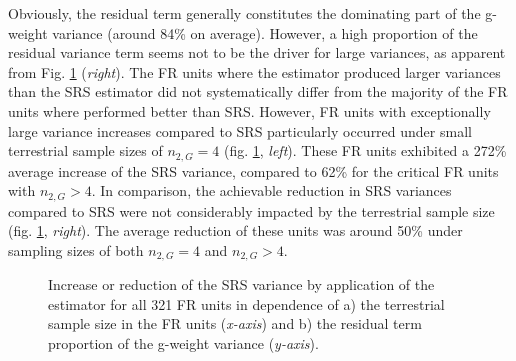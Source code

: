 Obviously, the residual term generally constitutes the dominating part of the \psmall{} g-weight variance (around 84\% on average). However, a high proportion of the residual variance term seems not to be the driver for large \psmall{} variances, as apparent from Fig. \ref{fig:fail} (\textit{right}). The FR units where the \psmall{} estimator produced larger variances than the SRS estimator did not systematically differ from the majority of the FR units where \psmall{} performed better than SRS. However, FR units with exceptionally large variance increases compared to SRS particularly occurred under small terrestrial sample sizes of $n_{2,G} = 4$ (fig. \ref{fig:fail}, \textit{left}). These FR units exhibited a 272\% average increase of the SRS variance, compared to 62\% for the critical FR units with $n_{2,G} > 4$. In comparison, the achievable reduction in SRS variances compared to SRS were not considerably impacted by the terrestrial sample size (fig. \ref{fig:fail}, \textit{right}). The average reduction of these units was around 50\% under sampling sizes of both $n_{2,G} = 4$ and $n_{2,G} > 4$. 

\begin{figure}[H]
	\centering
	\caption{Increase or reduction of the SRS variance by application of the \psmall{} estimator for all 321 FR units in dependence of a) the terrestrial sample size in the FR units (\textit{x-axis}) and b) the residual term proportion of the \psmall{} g-weight variance (\textit{y-axis}).}
	\label{fig:fail}
\end{figure}







